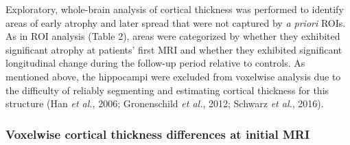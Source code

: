 \documentclass[]{article}
\begin{document}
Exploratory, whole-brain analysis of cortical thickness was performed to
identify areas of early atrophy and later spread that were not captured
by \emph{a priori} ROIs. As in ROI analysis (Table 2), areas were
categorized by whether they exhibited significant atrophy at patients'
first MRI and whether they exhibited significant longitudinal change
during the follow-up period relative to controls. As mentioned above,
the hippocampi were excluded from voxelwise analysis due to the
difficulty of reliably segmenting and estimating cortical thickness for
this structure (Han \emph{et al.}, 2006; Gronenschild \emph{et al.},
2012; Schwarz \emph{et al.}, 2016).

\subsubsection*{Voxelwise cortical thickness differences at initial
MRI}\label{voxelwise-cortical-thickness-differences-at-initial-mri}
\end{document}
